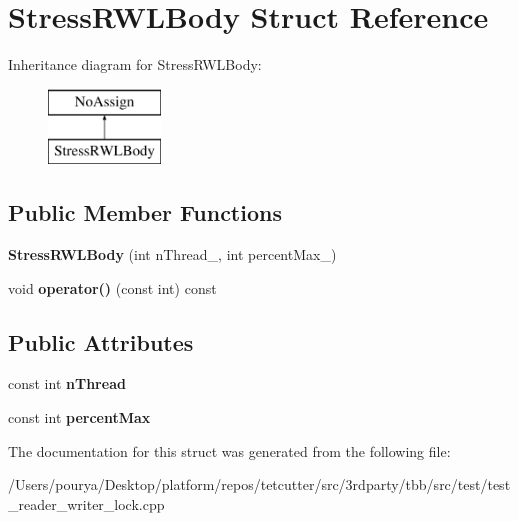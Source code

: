 \hypertarget{structStressRWLBody}{}\section{Stress\+R\+W\+L\+Body Struct Reference}
\label{structStressRWLBody}
Inheritance diagram for Stress\+R\+W\+L\+Body\+:\begin{figure}[H]
\begin{center}
\leavevmode
\includegraphics[height=2.000000cm]{structStressRWLBody}
\end{center}
\end{figure}
\subsection*{Public Member Functions}
\begin{DoxyCompactItemize}
\item 
\hypertarget{structStressRWLBody_a1cea319e6077f341d3650f24574b2b58}{}{\bfseries Stress\+R\+W\+L\+Body} (int n\+Thread\+\_\+, int percent\+Max\+\_\+)\label{structStressRWLBody_a1cea319e6077f341d3650f24574b2b58}

\item 
\hypertarget{structStressRWLBody_a17a9fc0c556d45cbf6da0f4ed18ada7c}{}void {\bfseries operator()} (const int) const \label{structStressRWLBody_a17a9fc0c556d45cbf6da0f4ed18ada7c}

\end{DoxyCompactItemize}
\subsection*{Public Attributes}
\begin{DoxyCompactItemize}
\item 
\hypertarget{structStressRWLBody_a3f7fbed964c9434730db5d2231227061}{}const int {\bfseries n\+Thread}\label{structStressRWLBody_a3f7fbed964c9434730db5d2231227061}

\item 
\hypertarget{structStressRWLBody_ae02dcadbe5b5be20487f2d31b6ed8b2e}{}const int {\bfseries percent\+Max}\label{structStressRWLBody_ae02dcadbe5b5be20487f2d31b6ed8b2e}

\end{DoxyCompactItemize}


The documentation for this struct was generated from the following file\+:\begin{DoxyCompactItemize}
\item 
/\+Users/pourya/\+Desktop/platform/repos/tetcutter/src/3rdparty/tbb/src/test/test\+\_\+reader\+\_\+writer\+\_\+lock.\+cpp\end{DoxyCompactItemize}
